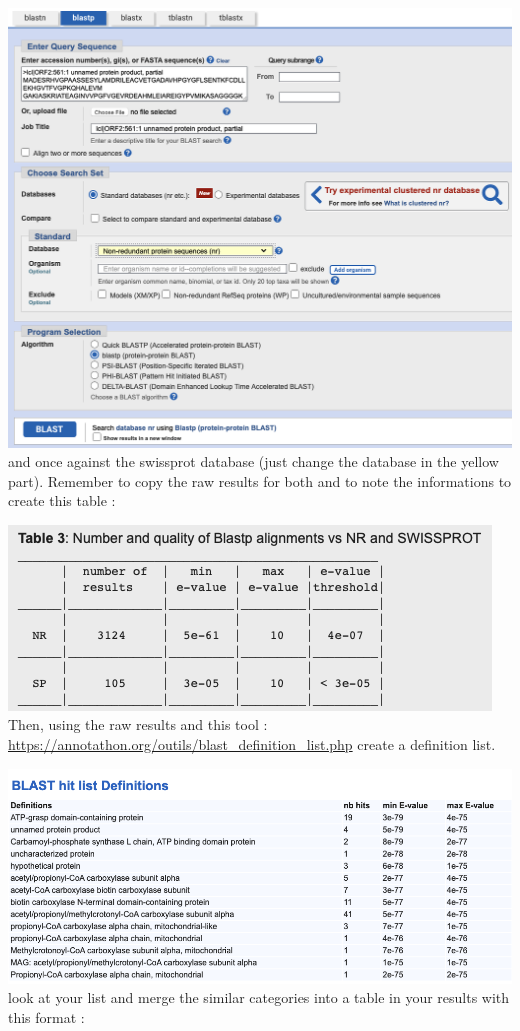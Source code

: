 \documentclass[
]{book}
\begin{document}
\includegraphics{figures/Annotathon/Annot_BLASTp_NR.png}
and once against the swissprot database (just change the database in the yellow part). Remember to copy the raw results for both and to note the informations to create this table :

\includegraphics{figures/Annotathon/Annot_table3_BLASTp.png}
Then, using the raw results and this tool : \url{https://annotathon.org/outils/blast_definition_list.php}
create a definition list.

\includegraphics{figures/Annotathon/Annot_BLAST_hit_list.png}
look at your list and merge the similar categories into a table in your results with this format :
\end{document}
